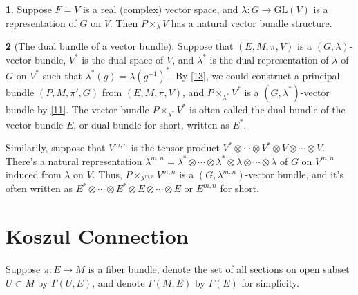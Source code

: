 \documentclass[11pt]{article}
\theoremstyle{definition}
\newtheorem{para}{}[part]
\theoremstyle{plain}
\begin{document}
\begin{para}
	Suppose $F=V$ is a real (complex) vector space, and $\lambda:G\to \mathrm{GL}(V)$ is a representation of $G$ on $V$. Then $P\times_\lambda V$ has a natural vector bundle structure.
\end{para}

\begin{para}[The dual bundle of a vector bundle]
	Suppose that $(E,M,\pi,V)$ is a $(G,\lambda)$-vector bundle, $V^*$ is the dual space of $V$, and $\lambda^*$ is the dual representation of $\lambda$ of $G$ on $V^*$ such that $\lambda^*(g)=\lambda(g^{-1})^*$. By \ref{13}, we could construct a principal bundle $(P,M,\pi',G)$ from $(E,M,\pi,V)$, and $P\times_{\lambda^*} V^*$ is a $(G,\lambda^*)$-vector bundle by \ref{11}. The vector bundle $P\times_{\lambda^*} V^*$ is often called the dual bundle of the vector bundle $E$, or dual bundle for short, written as $E^*$.
\end{para}


Similarily, suppose that $V^{m,n}$ is the tensor product $V^*\otimes \cdots \otimes V^*\otimes V \otimes \cdots \otimes V$. There's a natural representation $\lambda^{m,n}=\lambda^*\otimes \cdots \otimes \lambda^*\otimes \lambda \otimes \cdots \otimes \lambda$ of $G$ on $V^{m,n}$ induced from $\lambda$ on $V$. Thus, $P\times_{\lambda^{m,n}} V^{m,n}$ is a $(G,\lambda^{m,n})$-vector bundle, and it's often written as $E^*\otimes \cdots \otimes E^*\otimes E \otimes \cdots \otimes E$ or $E^{m,n}$ for short.

\section{Koszul Connection}

Suppose $\pi:E\to M$ is a fiber bundle, denote the set of all sections on open subset $U\subset M$ by $\Gamma(U,E)$, and denote $\Gamma(M,E)$ by $\Gamma(E)$ for simplicity.
\end{document}

